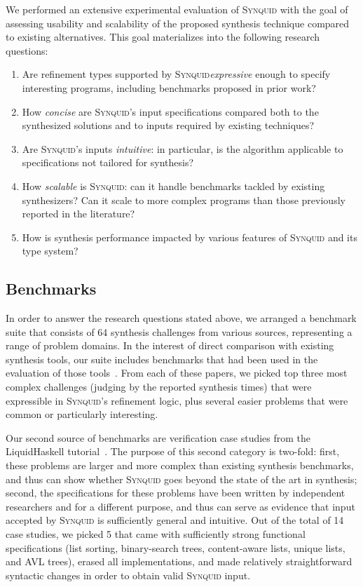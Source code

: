 \documentclass[10pt,preprint]{sigplanconf-pldi16}
\theoremstyle{definition}
\newcommand{\tool}{\textsc{Synquid}\xspace}
\newcommand{\exCount}{64\xspace}
\begin{document}
We performed an extensive experimental evaluation of \tool
with the goal of assessing usability and scalability of the proposed synthesis technique
compared to existing alternatives.
This goal materializes into the following research questions:
\begin{enumerate}[(1)]
\item Are refinement types supported by \tool \emph{expressive} enough to specify interesting programs, including benchmarks proposed in prior work?
\item How \emph{concise} are \tool's input specifications compared both to the synthesized solutions and to inputs required by existing techniques?
\item Are \tool's inputs \emph{intuitive}: in particular, is the algorithm applicable to specifications not tailored for synthesis?
\item How \emph{scalable} is \tool: can it handle benchmarks tackled by existing synthesizers?
Can it scale to more complex programs than those previously reported in the literature?
\item How is synthesis performance impacted by various features of \tool and its type system?
\end{enumerate}

\subsection{Benchmarks}\label{sec:eval:benchmarks}

In order to answer the research questions stated above, we arranged a benchmark suite that consists of \exCount synthesis challenges
from various sources, representing a range of problem domains.
In the interest of direct comparison with existing synthesis tools, 
our suite includes benchmarks that had been used in the evaluation of those tools~\cite{KneussKuKuSu13,LeinoMi12,OseraZd15,FrankleOWZ16,FeserChDi15,AlbarghouthiGuKi13,MilicevicNKJ15,AlurCR15}. From each of these papers, we picked top three most complex challenges (judging by the reported synthesis times) that were expressible in \tool's refinement logic,
plus several easier problems that were common or particularly interesting. 

Our second source of benchmarks are verification case studies from the LiquidHaskell tutorial~\cite{LiquidHaskellTutorial}.
The purpose of this second category is two-fold:
first, these problems are larger and more complex than existing synthesis benchmarks,
and thus can show whether \tool goes beyond the state of the art in synthesis;
second, the specifications for these problems have been written by independent researchers and for a different purpose,
and thus can serve as evidence that input accepted by \tool is sufficiently general and intuitive.
Out of the total of 14 case studies, we picked 5 that came with sufficiently strong functional specifications
(list sorting, binary-search trees, content-aware lists, unique lists, and AVL trees),
erased all implementations,
and made relatively straightforward syntactic changes in order to obtain valid \tool input.
\end{document}

